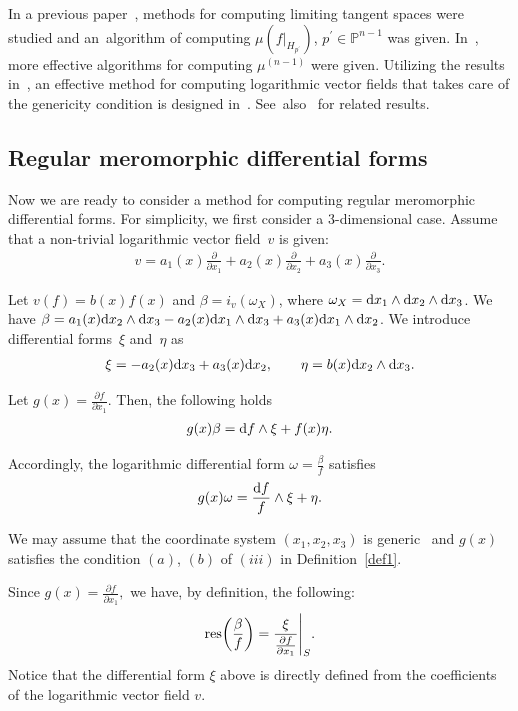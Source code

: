 \documentclass[10pt,a4paper]{amsart}
\numberwithin{equation}{section}
\begin{document}
In a previous paper~\cite{NT18b}, methods for computing limiting tangent spaces were studied and an~algorithm of computing $ \mu(f|_{H_{p^{\prime}}})$, $p^{\prime} \in {\mathbb P}^{n-1} $ was given. In~\cite{NT17b,NT19b}, more effective algorithms for computing $ \mu^{(n-1)} $ were given. Utilizing the results in~\cite{NT17b,NT19b}, an effective method for compu\-ting logarithmic vector fields that takes care of the genericity condition is designed in~\cite{NT19a, TN20}. See~also~\cite{TN20a} for related results.


\subsection{Regular meromorphic differential forms}

Now we are ready to consider a method for computing regular meromorphic differential forms. For simplicity, we first consider a 3-dimensional case. Assume that a non-trivial logarithmic vector field~$v$ is given:
\begin{gather*}
v=a_1(x)\frac{\partial}{\partial x_1} + a_2(x)\frac{\partial}{\partial x_2}+a_3(x)\frac{\partial}{\partial x_3}.
\end{gather*}

Let $v(f)=b(x)f(x)$ and $\beta=i_v(\omega_X) $, where $\omega_X={\rm d}x_1\wedge {\rm d}x_2\wedge {\rm d}x_3$. We have $\beta=a_1(x){\rm d}x_2\wedge {\rm d}x_3-a_2(x){\rm d}x_1\wedge {\rm d}x_3+a_3(x){\rm d}x_1\wedge {\rm d}x_2$.
We introduce differential forms~$ \xi$ and~$\eta$ as
\begin{gather*}
\xi=-a_2(x){\rm d}x_3+a_3(x){\rm d}x_2, \qquad
\eta =b(x){\rm d}x_2\wedge {\rm d}x_3.
\end{gather*}

Let $g(x)=\frac{\partial f}{\partial x_1}$. Then, the following holds
\begin{gather*}
g(x)\beta= {\rm d}f\wedge \xi + f(x)\eta.
\end{gather*}

Accordingly, the logarithmic differential form $ \omega=\frac{\beta}{f} $ satisfies
\begin{gather*}
g(x)\omega=\frac{{\rm d}f}{f} \wedge \xi + \eta.
\end{gather*}

We may assume that the coordinate system $(x_1,x_2,x_3)$ is generic~\cite{NT19a} and $g(x)$ satisfies the condition $(a)$, $(b)$ of $(iii)$ in Definition~\ref{def1}.


Since $ g(x) = \frac{\partial f}{\partial x_1}, $ we have, by definition, the following:
\begin{gather*}
{\rm res}\bigg(\frac{\beta}{f}\bigg) = \frac{\xi}{\frac{\partial f}{\partial x_1}}\Bigg|_S.
\end{gather*}
Notice that the differential form $ \xi$ above is directly defined from the coefficients of the logarithmic vector field $v$.
\end{document}

